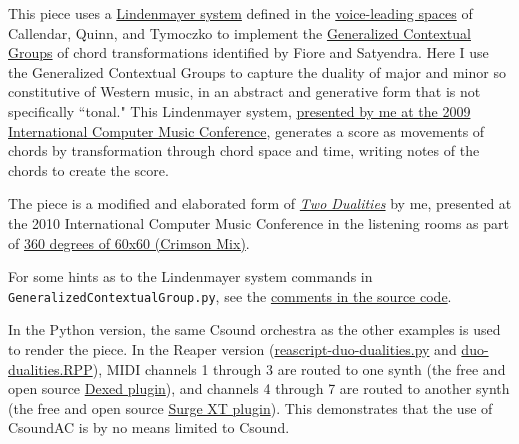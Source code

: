 \documentclass[letterpaper,10pt,DIV=12,parskip=half]{scrartcl}
\begin{document}
This piece uses a \href{https://algorithmicbotany.org/papers/abop/abop.pdf}{Lindenmayer system} defined in the \href{https://dmitri.mycpanel.princeton.edu/files/publications/science2.pdf}{voice-leading spaces} of Callendar, Quinn, and Tymoczko to implement the \href{https://www.mtosmt.org/issues/mto.05.11.3/mto.05.11.3.fiore_satyendra.pdf}{Generalized Contextual Groups} of chord transformations identified by Fiore and Satyendra. Here I use the Generalized Contextual Groups to capture the duality of major and minor so constitutive of Western music, in an abstract and generative form that is not specifically ``tonal." This Lindenmayer system, \href{https://citeseerx.ist.psu.edu/document?repid=rep1&type=pdf&doi=dd8623bbe8c889b2c56d6a1fc0fc55c61b362ee4}{presented by me at the 2009 International Computer Music Conference}, generates a score as movements of chords by transformation through chord space and time, writing notes of the chords to create the score. 

The piece is a modified and elaborated form of \href{https://music.youtube.com/watch?v=3_ahbL44p-E}{\emph{Two Dualities}} by me, presented at the 2010 International Computer Music Conference in the listening rooms as part of \href{http://www.voxnovus.com/60x60/2010_Crimson_Mix.htm}{360 degrees of 60x60 (Crimson Mix)}.

For some hints as to the Lindenmayer system commands in \lstinline|GeneralizedContextualGroup.py|, see the \href{https://github.com/gogins/csound-ac/blob/master/silencio/python/GeneralizedContextualGroup.py}{comments in the source code}.

In the Python version, the same Csound orchestra as the other examples is used to render the piece. In the Reaper version (\href{xxx}{reascript-duo-dualities.py} and \href{xxx}{duo-dualities.RPP}), MIDI channels 1 through 3 are routed to one synth (the free and open source \href{https://asb2m10.github.io/dexed/}{Dexed plugin}), and channels 4 through 7 are routed to another synth (the free and open source \href{https://surge-synthesizer.github.io/}{Surge XT plugin}). This demonstrates that the use of CsoundAC is by no means limited to Csound.
\end{document}
